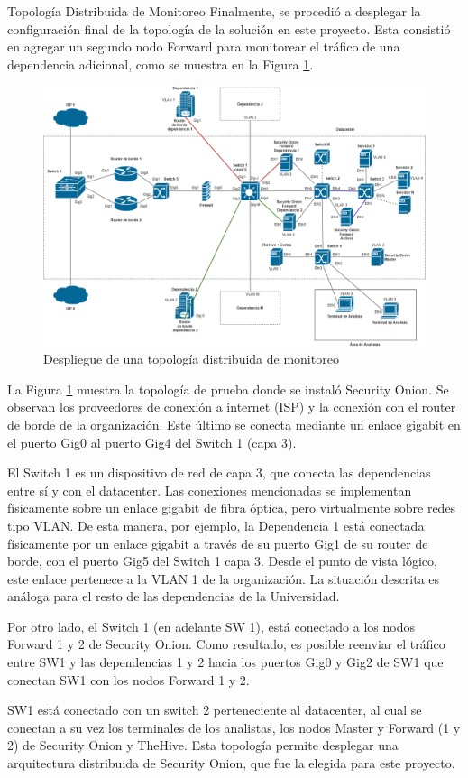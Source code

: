 \begin{subsection}{Topología Distribuida de Monitoreo}
    Finalmente, se procedió a desplegar la configuración final de la topología de la solución en este proyecto. Esta consistió en agregar un segundo nodo Forward para monitorear el tráfico de una dependencia adicional, como se muestra en la Figura \ref{fig:iter1_top_d_unc}.
    \begin{figure}[H]
    \centering
    \includegraphics[width=1\textwidth]{./iteracion_1_imagenes/figura_topologia_d_unc.png}
    \caption{Despliegue de una topología distribuida de monitoreo}
    \label{fig:iter1_top_d_unc}
    \end{figure}
    La Figura \ref{fig:iter1_top_d_unc} muestra la topología de prueba donde se instaló Security Onion. Se observan los proveedores de conexión a internet (ISP) y la conexión con el router de borde de la organización. Este último se conecta mediante un enlace gigabit en el puerto Gig0 al puerto Gig4 del Switch 1 (capa 3). \par
    El Switch 1 es un dispositivo de red de capa 3, que conecta las dependencias entre sí y con el datacenter. Las conexiones mencionadas se implementan físicamente sobre un enlace gigabit de fibra óptica, pero virtualmente sobre redes tipo VLAN. De esta manera, por ejemplo, la Dependencia 1 está conectada físicamente por un enlace gigabit a través de su puerto Gig1 de su router de borde, con el puerto Gig5 del Switch 1 capa 3. Desde el punto de vista lógico, este enlace pertenece a la VLAN 1 de la organización. La situación descrita es análoga para el resto de las dependencias de la Universidad. \par
    Por otro lado, el Switch 1 (en adelante SW 1), está conectado a los nodos Forward 1 y 2 de Security Onion. Como resultado, es posible reenviar el tráfico entre SW1 y las dependencias 1 y 2 hacia los puertos Gig0 y Gig2 de SW1 que conectan SW1 con los nodos Forward 1 y 2. \par
    SW1 está conectado con un switch 2 perteneciente al datacenter, al cual se conectan a su vez los terminales de los analistas, los nodos Master y Forward (1 y 2) de Security Onion y TheHive. Esta topología permite desplegar una arquitectura distribuida de Security Onion, que fue la elegida para este proyecto.
    \end{subsection}
